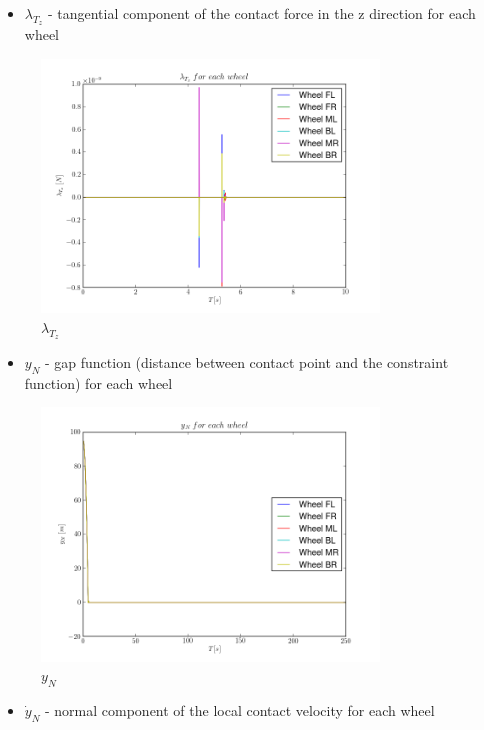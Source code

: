 \begin{itemize}
  \item $\lambda_{T_z}$ - tangential component of the contact force in the z direction for each wheel
\end{itemize}

\begin{figure}[H]
  \centering
    \includegraphics[width=0.8\textwidth]{lambdaTx}
  \caption{$\lambda_{T_z}$}
\end{figure}

\begin{itemize}
  \item $y_{N}$ - gap function (distance between contact point and the constraint function) for each wheel
\end{itemize}

\begin{figure}[H]
  \centering
    \includegraphics[width=0.8\textwidth]{yN}
  \caption{$y_{N}$}
\end{figure}

\begin{itemize}
  \item $\dot{y}_{N}$ - normal component of the local contact velocity for each wheel
\end{itemize}

